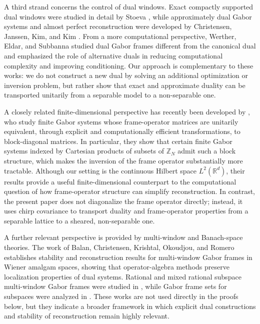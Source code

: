 \documentclass[final,1p,times,authoryear]{elsarticle}
\theoremstyle{definition}
\newcommand{\1}{\mathbf{1}}
\begin{document}
A third strand concerns the control of dual windows. Exact compactly supported dual windows were studied in
detail by Stoeva \citep{Sto22}, while approximately dual Gabor systems and almost perfect reconstruction were
developed by Christensen, Janssen, Kim, and Kim \citep{CJKK18}. From a more computational perspective,
Werther, Eldar, and Subbanna \citep{WES05} studied dual Gabor frames different from the canonical dual and
emphasized the role of alternative duals in reducing computational complexity and improving conditioning.
Our approach is complementary to these works: we do not construct a new dual by solving an additional
optimization or inversion problem, but rather show that exact and approximate duality can be transported
unitarily from a separable model to a non-separable one.

A closely related finite-dimensional perspective has recently been developed by
\citet{AsipchukDeCarliRodriguez26}, who study finite Gabor systems whose frame-operator matrices are unitarily equivalent, through explicit and computationally efficient transformations, to block-diagonal matrices. In particular, they show that certain finite Gabor systems indexed by Cartesian products of subsets of $\mathbb Z_N$ admit such a block structure, which makes the inversion of the frame operator substantially more tractable. Although our setting is the continuous Hilbert space $L^2(\mathbb R^d)$, their results provide a useful finite-dimensional counterpart to the computational question of how frame-operator structure can simplify reconstruction. In contrast, the present paper does not diagonalize the frame operator directly; instead, it uses chirp covariance to transport duality and frame-operator properties from a separable lattice to a sheared, non-separable one.


A further relevant perspective is provided by multi-window and Banach-space theories. The work of Balan,
Christensen, Krishtal, Okoudjou, and Romero \citep{BCKOR13} establishes stability and reconstruction results
for multi-window Gabor frames in Wiener amalgam spaces, showing that operator-algebra methods preserve
localization properties of dual systems. Rational and mixed rational subspace multi-window Gabor frames were
studied in \citep{ZL14,ZL18}, while Gabor frame sets for subspaces were analyzed in \citep{LL11}. These works
are not used directly in the proofs below, but they indicate a broader framework in which explicit dual
constructions and stability of reconstruction remain highly relevant.
\end{document}
